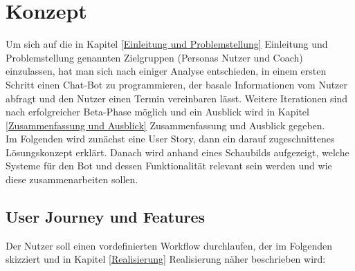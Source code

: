 \chapter{Konzept} \label{Konzept}


Um sich auf die in Kapitel \ref{Einleitung und Problemstellung} Einleitung und Problemstellung genannten Zielgruppen (Personas Nutzer und Coach) einzulassen, hat man sich nach einiger Analyse entschieden, in einem ersten Schritt einen Chat-Bot zu programmieren, der basale Informationen vom Nutzer abfragt und den Nutzer einen Termin vereinbaren lässt. Weitere Iterationen sind nach erfolgreicher Beta-Phase möglich und ein Ausblick wird in Kapitel \ref{Zusammenfassung und Ausblick} Zusammenfassung und Ausblick gegeben. \\ Im Folgenden wird zunächst eine User Story, dann ein darauf zugeschnittenes Lösungskonzept erklärt. Danach wird anhand eines Schaubilds aufgezeigt, welche Systeme für den Bot und dessen Funktionalität relevant sein werden und wie diese zusammenarbeiten sollen. 

\section{User Journey und Features} \label{Konzept: User Journey}
	Der Nutzer soll einen vordefinierten Workflow durchlaufen, der im Folgenden skizziert und in Kapitel \ref*{Realisierung} Realisierung näher beschrieben wird:

